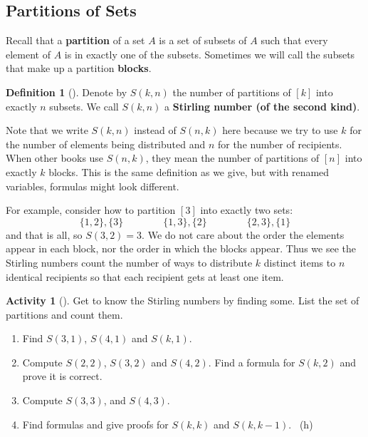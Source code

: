 \documentclass[10pt,]{book}
\newcommand{\terminology}[1]{\textbf{#1}}
\theoremstyle{plain}
\theoremstyle{definition}
\newtheorem{definition}[theorem]{Definition}
\theoremstyle{definition}
\theoremstyle{definition}
\newtheorem{activity}[project]{Activity}
\numberwithin{equation}{chapter}
\begin{document}
\subsection[{Partitions of Sets}]{Partitions of Sets}\label{subsection-24}
\hypertarget{p-1073}{}%
Recall that a \terminology{partition} of a set \(A\) is a set of subsets of \(A\) such that every element of \(A\) is in exactly one of the subsets.  Sometimes we will call the subsets that make up a partition \terminology{blocks}.%
\begin{definition}[{}]\label{def-stirling}
\hypertarget{p-1074}{}%
Denote by \(S(k,n)\) the number of partitions of \([k]\) into exactly \(n\) subsets.  We call \(S(k,n)\) a \terminology{Stirling number (of the second kind)}.%
\end{definition}
\hypertarget{p-1075}{}%
Note that we write \(S(k,n)\) instead of \(S(n,k)\) here because we try to use \(k\) for the number of elements being distributed and \(n\) for the number of recipients.  When other books use \(S(n,k)\), they mean the number of partitions of \([n]\) into exactly \(k\) blocks.  This is the same definition as we give, but with renamed variables, formulas might look different.%
\par
\hypertarget{p-1076}{}%
For example, consider how to partition \([3]\) into exactly two sets:%
\begin{equation*}
\{1,2\}, \{3\} \qquad \qquad \{1,3\},\{2\} \qquad \qquad \{2,3\},\{1\}
\end{equation*}
and that is all, so \(S(3,2) = 3\).  We do not care about the order the elements appear in each block, nor the order in which the blocks appear.  Thus we see the Stirling numbers count the number of ways to distribute \(k\) distinct items to \(n\) identical recipients so that each recipient gets at least one item.%
\begin{activity}[]\label{act_stirlingcomputations}
\hypertarget{p-1077}{}%
Get to know the Stirling numbers by finding some.  List the set of partitions and count them.%
\begin{enumerate}[font=\bfseries,label=(\alph*),ref=\alph*]
\item\label{task-207} \hypertarget{p-1078}{}%
Find \(S(3,1)\), \(S(4,1)\) and \(S(k,1)\).%
\item\label{task-208} \hypertarget{p-1079}{}%
Compute \(S(2,2)\), \(S(3,2)\) and \(S(4,2)\).  Find a formula for \(S(k,2)\) and prove it is correct.%
\item\label{task-209} \hypertarget{p-1080}{}%
Compute \(S(3,3)\), and \(S(4,3)\).%
\item\label{task-210} \hypertarget{p-1081}{}%
Find formulas and give proofs for \(S(k,k)\) and \(S(k,k - 1)\).%
~{\tiny (h)}\end{enumerate}
\end{activity}
\end{document}
